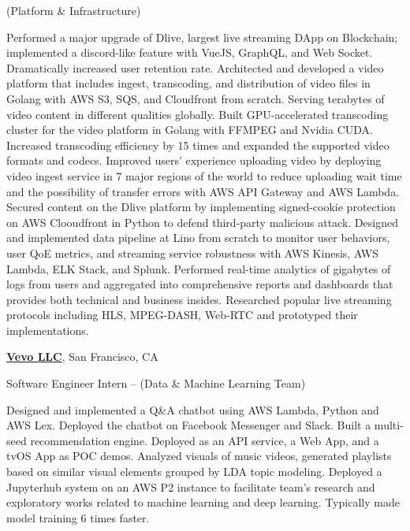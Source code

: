 \documentclass[letterpaper,MMMyyyy,nonstopmode]{simpleresumecv}
\begin{document}
\begin{Body}
\newline
(Platform \& Infrastructure)
\begin{Detail}
\SubBulletItem
Performed a major upgrade of Dlive, largest live streaming DApp on Blockchain; implemented a discord-like feature with VueJS, GraphQL, and Web Socket. Dramatically increased user retention rate.
\SubBulletItem
Architected and developed a video platform that includes ingest, transcoding, and distribution of video files in Golang with AWS S3, SQS, and Cloudfront from scratch. Serving terabytes of video content in different qualities globally.
\SubBulletItem
Built GPU-accelerated transcoding cluster for the video platform in Golang with FFMPEG and Nvidia CUDA. Increased transcoding efficiency by 15 times and expanded the supported video formats and codecs.
\SubBulletItem
Improved users' experience uploading video by deploying video ingest service in 7 major regions of the world to reduce uploading wait time and the possibility of transfer errors with AWS API Gateway and AWS Lambda.
\SubBulletItem
Secured content on the Dlive platform by implementing signed-cookie protection on AWS Clooudfront in Python to defend third-party malicious attack.
\SubBulletItem
Designed and implemented data pipeline at Lino from scratch to monitor user behaviors, user QoE metrics, and streaming service robustness with AWS Kinesis, AWS Lambda, ELK Stack, and Splunk. Performed real-time analytics of gigabytes of logs from users and aggregated into comprehensive reports and dashboards that provides both technical and business insides.
\SubBulletItem
Researched popular live streaming protocols including HLS, MPEG-DASH, Web-RTC and prototyped their implementations.
\end{Detail}

\BigGap
\Entry
\href{https://hq.vevo.com/}
{\textbf{Vevo LLC}},
San Francisco, CA

\Gap
\BulletItem
Software Engineer Intern
\hfill
{} --
\newline
(Data \& Machine Learning Team)
\begin{Detail}
\SubBulletItem
Designed and implemented a Q\&A chatbot using AWS Lambda, Python and AWS Lex. Deployed the chatbot on Facebook Messenger and Slack.
\SubBulletItem
Built a multi-seed recommendation engine. Deployed as an API service, a Web App, and a tvOS App as POC demos.
\SubBulletItem
Analyzed visuals of music videos, generated playlists based on similar visual elements grouped by LDA topic modeling.
\SubBulletItem
Deployed a Jupyterhub system on an AWS P2 instance to facilitate team's research and exploratory works related to machine learning and deep learning. Typically made model training 6 times faster.
\end{Detail}


\end{Body}
\end{document}
